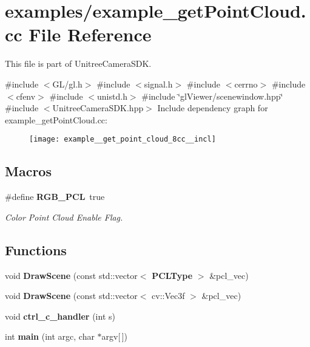 \section{examples/example\+\_\+get\+Point\+Cloud.cc File Reference}
\label{example__get_point_cloud_8cc}


This file is part of Unitree\+Camera\+S\+DK.  


{\ttfamily \#include $<$G\+L/gl.\+h$>$}\newline
{\ttfamily \#include $<$signal.\+h$>$}\newline
{\ttfamily \#include $<$cerrno$>$}\newline
{\ttfamily \#include $<$cfenv$>$}\newline
{\ttfamily \#include $<$unistd.\+h$>$}\newline
{\ttfamily \#include \char`\"{}gl\+Viewer/scenewindow.\+hpp\char`\"{}}\newline
{\ttfamily \#include $<$Unitree\+Camera\+S\+D\+K.\+hpp$>$}\newline
Include dependency graph for example\+\_\+get\+Point\+Cloud.\+cc\+:\nopagebreak
\begin{figure}[H]
\begin{center}
\leavevmode
\texttt{[image: example\_\_get\_point\_cloud\_8cc\_\_incl]}
\end{center}
\end{figure}
\subsection*{Macros}
\begin{DoxyCompactItemize}
\item 
\mbox{\label{example__get_point_cloud_8cc_a252571170a109b31218383613dc16295}} 
\#define \textbf{ R\+G\+B\+\_\+\+P\+CL}~true
\begin{DoxyCompactList}\small\item\em Color Point Cloud Enable Flag. \end{DoxyCompactList}\end{DoxyCompactItemize}
\subsection*{Functions}
\begin{DoxyCompactItemize}
\item 
\mbox{\label{example__get_point_cloud_8cc_a3ba436e743e30c5f31f98acb33bcd50b}} 
void {\bfseries Draw\+Scene} (const std\+::vector$<$ \textbf{ P\+C\+L\+Type} $>$ \&pcl\+\_\+vec)
\item 
\mbox{\label{example__get_point_cloud_8cc_a27d13c3979cbbf70959fddbf5cc02bb5}} 
void {\bfseries Draw\+Scene} (const std\+::vector$<$ cv\+::\+Vec3f $>$ \&pcl\+\_\+vec)
\item 
\mbox{\label{example__get_point_cloud_8cc_a35f9ea2056a80a6c96b5c3ef3c19dafd}} 
void {\bfseries ctrl\+\_\+c\+\_\+handler} (int s)
\item 
\mbox{\label{example__get_point_cloud_8cc_a0ddf1224851353fc92bfbff6f499fa97}} 
int {\bfseries main} (int argc, char $\ast$argv[$\,$])
\end{DoxyCompactItemize}
